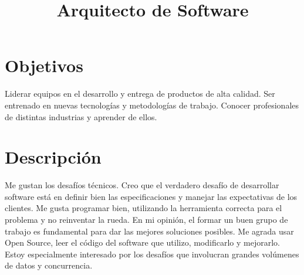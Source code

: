 \documentclass[a4paper,11pt]{moderncv}
\title{Arquitecto de Software}
\begin{document}
\maketitle

\section{Objetivos}
Liderar equipos en el desarrollo y entrega de productos de alta calidad. Ser
entrenado en nuevas tecnolog\'ias y metodolog\'ias de trabajo. Conocer
profesionales de distintas industrias y aprender de ellos.

\section{Descripci\'on}
Me gustan los desaf\'ios t\'ecnicos. Creo que el verdadero desaf\'io de
desarrollar software est\'a en definir bien las especificaciones y manejar las
expectativas de los clientes. Me gusta programar bien, utilizando la
herramienta correcta para el problema y no reinventar la rueda. En mi
opini\'on, el formar un buen grupo de trabajo es fundamental para dar las
mejores soluciones posibles. Me agrada usar Open Source, leer el c\'odigo del
software que utilizo, modificarlo y mejorarlo. Estoy especialmente interesado
por los desaf\'ios que involucran grandes vol\'umenes de datos y concurrencia.
\end{document}
